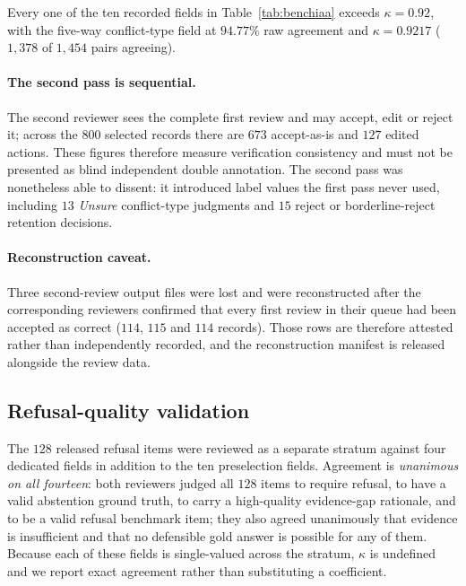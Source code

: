 

Every one of the ten recorded fields in Table~\ref{tab:benchiaa} exceeds
$\kappa=0.92$, with the five-way conflict-type field at $94.77\%$ raw agreement
and $\kappa=0.9217$ ($1{,}378$ of $1{,}454$ pairs agreeing).

\paragraph{The second pass is sequential.} The second reviewer sees the complete
first review and may accept, edit or reject it; across the 800 selected records
there are $673$ accept-as-is and $127$ edited actions. These figures therefore
measure verification consistency and must not be presented as blind independent
double annotation. The second pass was nonetheless able to dissent: it introduced
label values the first pass never used, including $13$ \textit{Unsure}
conflict-type judgments and $15$ reject or borderline-reject retention decisions.

\paragraph{Reconstruction caveat.} Three second-review output files were lost and
were reconstructed after the corresponding reviewers confirmed that every first
review in their queue had been accepted as correct ($114$, $115$ and $114$
records). Those rows are therefore attested rather than independently recorded,
and the reconstruction manifest is released alongside the review data.

\subsection{Refusal-quality validation}
\label{app:refusalquality}

The $128$ released refusal items were reviewed as a separate stratum against four
dedicated fields in addition to the ten preselection fields. Agreement is
\emph{unanimous on all fourteen}: both reviewers judged all $128$ items to
require refusal, to have a valid abstention ground truth, to carry a
high-quality evidence-gap rationale, and to be a valid refusal benchmark item;
they also agreed unanimously that evidence is insufficient and that no defensible
gold answer is possible for any of them. Because each of these fields is
single-valued across the stratum, $\kappa$ is undefined and we report exact
agreement rather than substituting a coefficient.

